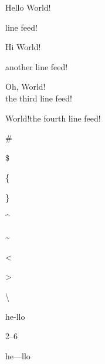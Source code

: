 \documentclass[a4paper]{article}
\begin{document}
Hello World!           %

line feed!

Hi World!\par another line feed!


Oh, World!\\the third line feed!

World!\newline the fourth line feed!

\#  %

\$  %

\{  %

\}  %

\^{}  %

\~{}  %

\textless   %

\textgreater   %

\textbar       %

\textbackslash   %

he-llo           %

2--6              %

he---llo          %
\end{document}
